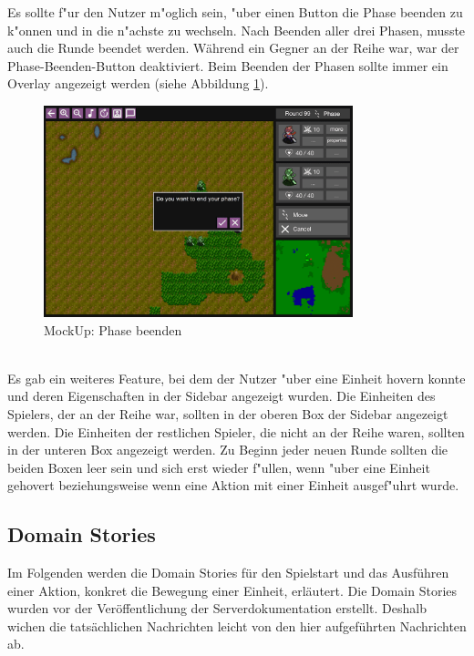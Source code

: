 \documentclass[12pt, titlepage]{scrartcl}
\newcounter{subsubsubsection}[subsubsection]
\begin{document}
			        Es sollte f"ur den Nutzer m"oglich sein, "uber einen Button die Phase beenden zu k"onnen und in die n"achste zu wechseln. Nach Beenden aller drei Phasen, musste auch die Runde beendet werden. W\"ahrend ein Gegner an der Reihe war, war der Phase-Beenden-Button deaktiviert. Beim Beenden der Phasen sollte immer ein Overlay angezeigt werden (siehe Abbildung \ref{Phase_End}). \\
			        \begin{figure}[H] 
    				    \centering
    				    \includegraphics[width=0.8\textwidth]{images/mockUps/EndPhase.png}
    				    \caption{MockUp: Phase beenden}
    				    \label{Phase_End}
			        \end{figure}
			        \ \\ Es gab ein weiteres Feature, bei dem der Nutzer "uber eine Einheit hovern konnte und deren Eigenschaften in der Sidebar angezeigt wurden. Die Einheiten des Spielers, der an der Reihe war, sollten in der oberen Box der Sidebar angezeigt werden. Die Einheiten der restlichen Spieler, die nicht an der Reihe waren, sollten in der unteren Box angezeigt werden. Zu Beginn jeder neuen Runde sollten die beiden Boxen leer sein und sich erst wieder f"ullen, wenn "uber eine Einheit gehovert beziehungsweise wenn eine Aktion mit einer Einheit ausgef"uhrt wurde.
		\subsection{Domain Stories}
		    Im Folgenden werden die Domain Stories f\"ur den Spielstart und das Ausf\"uhren einer Aktion, konkret die Bewegung einer Einheit, erl\"autert. Die Domain Stories wurden vor der Ver\"offentlichung der Serverdokumentation erstellt. Deshalb wichen die tats\"achlichen Nachrichten leicht von den hier aufgef\"uhrten Nachrichten ab. \\
\end{document}
